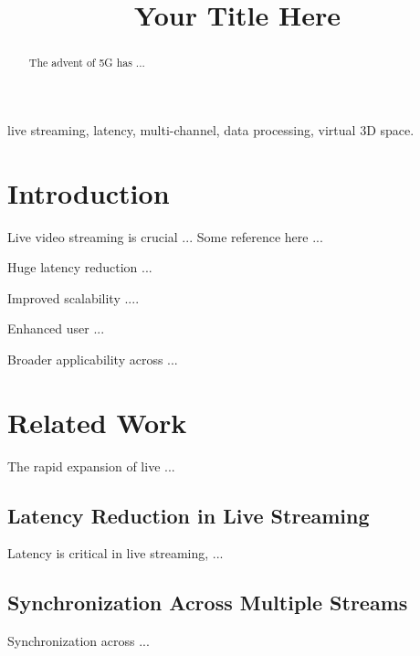 \documentclass[conference]{IEEEtran}
\begin{document}
\title{
Your Title Here \\
}

\author{
\and
{}
}

\maketitle

\begin{abstract}
The advent of 5G has ...
\end{abstract}

\begin{IEEEkeywords}
live streaming, latency, multi-channel, data processing, virtual 3D space.
\end{IEEEkeywords}


\section{Introduction}
\label{sec:intro}
\setlength{\parindent}{0pt}
Live video streaming is crucial ...
Some reference here \cite{usb3} ...

\textbullet\hspace{0.5em} Huge latency reduction ...

\textbullet\hspace{0.5em} Improved scalability ....

\textbullet\hspace{0.5em} Enhanced user ...

\textbullet\hspace{0.5em} Broader applicability across ...





\section{Related Work}
The rapid expansion of live ...

\subsection{Latency Reduction in Live Streaming}
Latency is critical in live streaming, ...

\subsection{Synchronization Across Multiple Streams}
Synchronization across ...



{\small


}
\end{document}
